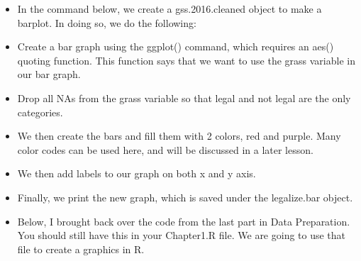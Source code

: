 \documentclass[
  letterpaper,
  DIV=11,
  numbers=noendperiod]{scrreprt}
\begin{document}
\begin{itemize}
\item
  In the command below, we create a gss.2016.cleaned object to make a
  barplot. In doing so, we do the following:
\item
  Create a bar graph using the ggplot() command, which requires an aes()
  quoting function. This function says that we want to use the grass
  variable in our bar graph.
\item
  Drop all NAs from the grass variable so that legal and not legal are
  the only categories.
\item
  We then create the bars and fill them with 2 colors, red and purple.
  Many color codes can be used here, and will be discussed in a later
  lesson.
\item
  We then add labels to our graph on both x and y axis.
\item
  Finally, we print the new graph, which is saved under the legalize.bar
  object.
\item
  Below, I brought back over the code from the last part in Data
  Preparation. You should still have this in your Chapter1.R file. We
  are going to use that file to create a graphics in R.
\end{itemize}
\end{document}
